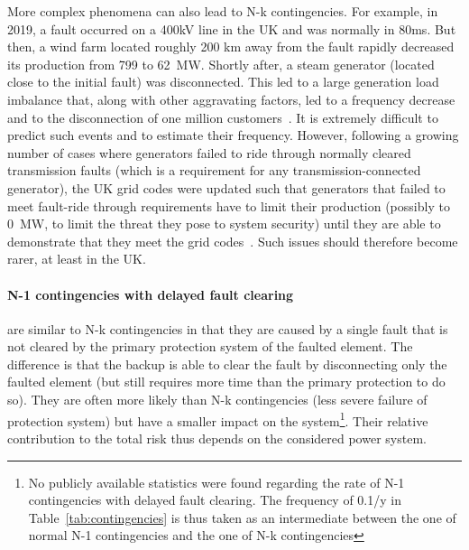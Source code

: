 More complex phenomena can also lead to N-k contingencies. For example, in 2019, a fault occurred on a 400kV line in the UK and was normally in 80ms. But then, a wind farm located roughly 200 km away from the fault rapidly decreased its production from 799 to 62~MW. Shortly after, a steam generator (located close to the initial fault) was disconnected. This led to a large generation load imbalance that, along with other aggravating factors, led to a frequency decrease and to the disconnection of one million customers~\cite{2019UKBlackout}. It is extremely difficult to predict such events and to estimate their frequency. However, following a growing number of cases where generators failed to ride through normally cleared transmission faults (which is a requirement for any transmission-connected generator), the UK grid codes were updated such that generators that failed to meet fault-ride through requirements have to limit their production (possibly to 0~MW, to limit the threat they pose to system security) until they are able to demonstrate that they meet the grid codes~\cite{FaultRideThroughEnforcement}. Such issues should therefore become rarer, at least in the UK.


\paragraph*{N-1 contingencies with delayed fault clearing} are similar to N-k contingencies in that they are caused by a single fault that is not cleared by the primary protection system of the faulted element. The difference is that the backup is able to clear the fault by disconnecting only the faulted element (but still requires more time than the primary protection to do so). They are often more likely than N-k contingencies (less severe failure of protection system) but have a smaller impact on the system\footnote{No publicly available statistics were found regarding the rate of N-1 contingencies with delayed fault clearing. The frequency of 0.1/y in Table~\ref{tab:contingencies} is thus taken as an intermediate between the one of normal N-1 contingencies and the one of N-k contingencies}. Their relative contribution to the total risk thus depends on the considered power system.


